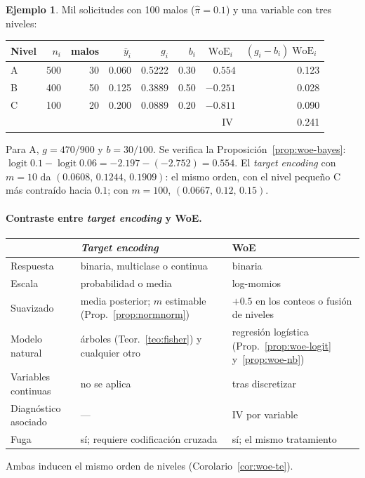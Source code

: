 \documentclass[11pt,a4paper]{article}
\theoremstyle{plain}
\theoremstyle{definition}
\newtheorem{ejemplo}[teorema]{Ejemplo}
\theoremstyle{remark}
\newcommand{\logit}{\operatorname{logit}}
\newcommand{\WoE}{\operatorname{WoE}}
\newcommand{\IV}{\operatorname{IV}}
\newcommand{\1}{\mathbf{1}}
\begin{document}
\begin{ejemplo}\label{ej:woe}
Mil solicitudes con 100 malos ($\hat\pi=0.1$) y una variable con tres
niveles:
\begin{center}
\begin{tabular}{@{}lrrrrrrr@{}}
\toprule
Nivel & $n_i$ & malos & $\bar y_i$ & $g_i$ & $b_i$ & $\WoE_i$ & $(g_i-b_i)\WoE_i$\\
\midrule
A & 500 & 30 & 0.060 & 0.5222 & 0.30 & $0.554$ & 0.123\\
B & 400 & 50 & 0.125 & 0.3889 & 0.50 & $-0.251$ & 0.028\\
C & 100 & 20 & 0.200 & 0.0889 & 0.20 & $-0.811$ & 0.090\\
\midrule
&&&&&&$\IV$&0.241\\
\bottomrule
\end{tabular}
\end{center}
Para A, $g=470/900$ y $b=30/100$. Se verifica la
Proposición~\ref{prop:woe-bayes}:
$\logit0.1-\logit0.06=-2.197-(-2.752)=0.554$. El \emph{target encoding}
con $m=10$ da $(0.0608,\,0.1244,\,0.1909)$: el mismo orden, con el nivel
pequeño C más contraído hacia $0.1$; con $m=100$, $(0.0667,\,0.12,\,0.15)$.
\end{ejemplo}

\paragraph{Contraste entre \emph{target encoding} y WoE.}
\begin{center}
\begin{tabularx}{\textwidth}{@{}lYY@{}}
\toprule
& \emph{Target encoding} & WoE\\
\midrule
Respuesta & binaria, multiclase o continua & binaria\\
Escala & probabilidad o media & log-momios\\
Suavizado & media posterior; $m$ estimable (Prop.~\ref{prop:normnorm}) & $+0.5$ en los conteos o fusión de niveles\\
Modelo natural & árboles (Teor.~\ref{teo:fisher}) y cualquier otro & regresión logística (Prop.~\ref{prop:woe-logit} y~\ref{prop:woe-nb})\\
Variables continuas & no se aplica & tras discretizar\\
Diagnóstico asociado & --- & IV por variable\\
Fuga & sí; requiere codificación cruzada & sí; el mismo tratamiento\\
\bottomrule
\end{tabularx}
\end{center}
Ambas inducen el mismo orden de niveles (Corolario~\ref{cor:woe-te}).
\end{document}
